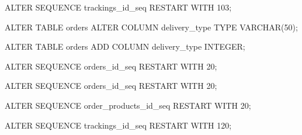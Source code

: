 ALTER SEQUENCE trackings_id_seq RESTART WITH 103;


ALTER TABLE orders
ALTER COLUMN delivery_type TYPE VARCHAR(50);

ALTER TABLE orders
ADD COLUMN delivery_type INTEGER;


ALTER SEQUENCE orders_id_seq RESTART WITH 20;

ALTER SEQUENCE orders_id_seq RESTART WITH 20;


ALTER SEQUENCE order_products_id_seq RESTART WITH 20;

ALTER SEQUENCE trackings_id_seq RESTART WITH 120;














